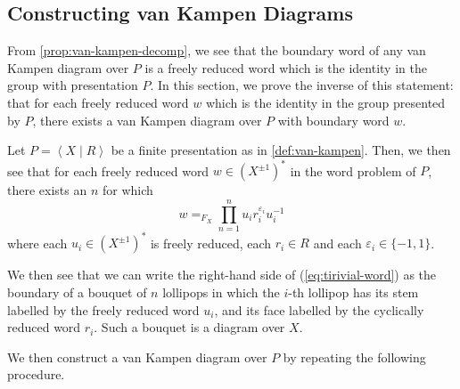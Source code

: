 \documentclass[11pt,a4paper,reqno]{amsart}
\theoremstyle{plain}
\theoremstyle{definition}
\theoremstyle{definition}
\begin{document}
\subsection{Constructing van Kampen Diagrams}\label{sec:van-kampen-construct}

From \cref{prop:van-kampen-decomp}, we see that the boundary word of any van Kampen diagram over $P$ is a freely reduced word which is the identity in the group with presentation $P$.
In this section, we prove the inverse of this statement: that for each freely reduced word $w$ which is the identity in the group presented by $P$, there exists a van Kampen diagram over $P$ with boundary word $w$.

Let $P = \left\langle X\mid R\right\rangle$ be a finite presentation as in \cref{def:van-kampen}.
Then, we then see that for each freely reduced word $w \in (X^{\pm 1})^*$ in the word problem of $P$, there exists an $n$ for which 
\begin{equation}\label{eq:tirivial-word}
  w
  =_{F_X}
  \prod_{n=1}^n
  u_i r_i^{\varepsilon_i} u_i^{-1}
\end{equation}
where each $u_i \in (X^{\pm 1})^*$ is freely reduced, each $r_i \in R$ and each $\varepsilon_i \in \{-1,1\}$.

We then see that we can write the right-hand side of (\ref{eq:tirivial-word}) as the boundary of a bouquet of $n$ lollipops in which the $i$-th lollipop has its stem labelled by the freely reduced word $u_i$, and its face labelled by the cyclically reduced word $r_i$.
Such a bouquet is a diagram over $X$.

We then construct a van Kampen diagram over $P$ by repeating the following procedure.
\end{document}
